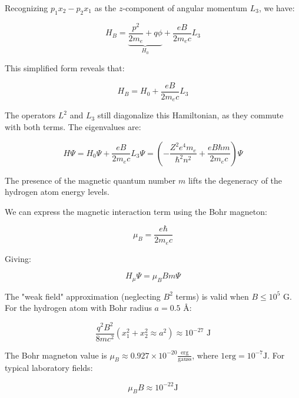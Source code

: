 \documentclass[10pt]{article}
\begin{document}
Recognizing $p_{1}x_{2}-p_{2}x_{1}$ as the $z$-component of angular momentum $L_3$, we have:

\begin{equation*}
H_{B}=\underbrace{\frac{p^{2}}{2m_e}+q\phi}_{H_0}+\frac{eB}{2m_e c}L_3 \tag{12.15}
\end{equation*}

This simplified form reveals that:

\begin{equation*}
H_{B}=H_0+\frac{eB}{2m_e c}L_3 \tag{12.16}
\end{equation*}

The operators $L^2$ and $L_3$ still diagonalize this Hamiltonian, as they commute with both terms. The eigenvalues are:

\begin{equation*}
H\Psi=H_0\Psi+\frac{eB}{2m_e c}L_3\Psi=\left(-\frac{Z^2e^4m_e}{\hbar^2n^2}+\frac{eB\hbar m}{2m_e c}\right)\Psi \tag{12.17}
\end{equation*}

The presence of the magnetic quantum number $m$ lifts the degeneracy of the hydrogen atom energy levels.

We can express the magnetic interaction term using the Bohr magneton:

\begin{equation*}
\mu_B=\frac{e\hbar}{2m_e c} \tag{12.18}
\end{equation*}

Giving:

\begin{equation*}
H_\mu\Psi=\mu_B Bm\Psi \tag{12.19}
\end{equation*}

The "weak field" approximation (neglecting $B^2$ terms) is valid when $B\leq 10^5$ G. For the hydrogen atom with Bohr radius $a=0.5$ Å:

\begin{equation*}
\frac{q^2B^2}{8mc^2}(x_1^2+x_2^2\approx a^2)\approx 10^{-27} \text{ J} \tag{12.20}
\end{equation*}


The Bohr magneton value is $\mu_{B} \approx 0.927 \times 10^{-20} \frac{\text{erg}}{\text{gauss}}$, where $1 \text{erg}=10^{-7} \text{J}$. For typical laboratory fields:

\begin{equation*}
\mu_{B}B \approx 10^{-22} \text{J} \tag{12.21}
\end{equation*}
\end{document}
